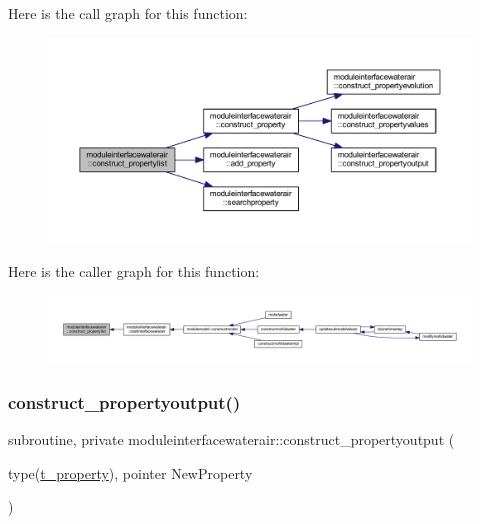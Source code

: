 Here is the call graph for this function\+:\nopagebreak
\begin{figure}[H]
\begin{center}
\leavevmode
\includegraphics[width=350pt]{namespacemoduleinterfacewaterair_a0102df656b49a2adcbef76f5a3a9e6d0_cgraph}
\end{center}
\end{figure}
Here is the caller graph for this function\+:\nopagebreak
\begin{figure}[H]
\begin{center}
\leavevmode
\includegraphics[width=350pt]{namespacemoduleinterfacewaterair_a0102df656b49a2adcbef76f5a3a9e6d0_icgraph}
\end{center}
\end{figure}
\mbox{\label{namespacemoduleinterfacewaterair_aa99a2e7fefb8e45ed29092e8c068982a}} 
\subsubsection{\texorpdfstring{construct\+\_\+propertyoutput()}{construct\_propertyoutput()}}
{\footnotesize\ttfamily subroutine, private moduleinterfacewaterair\+::construct\+\_\+propertyoutput (\begin{DoxyParamCaption}\item[{type(\mbox{\hyperlink{structmoduleinterfacewaterair_1_1t__property}{t\+\_\+property}}), pointer}]{New\+Property }\end{DoxyParamCaption})\hspace{0.3cm}{\ttfamily [private]}}

